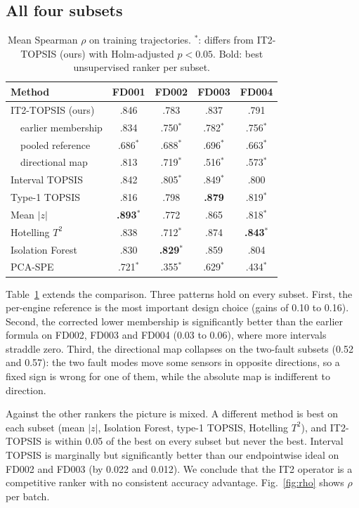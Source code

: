 \documentclass[journal,10pt,twocolumn]{IEEEtran}
\begin{document}
\subsection{All four subsets}
\begin{table}[t]
\centering
\footnotesize
\caption{Mean Spearman $\rho$ on training trajectories. $^{\ast}$: differs from IT2-TOPSIS (ours) with Holm-adjusted $p<0.05$. Bold: best unsupervised ranker per subset.}
\label{tab:all}
\begin{tabular}{lcccc}
\toprule
Method & FD001 & FD002 & FD003 & FD004 \\
\midrule
IT2-TOPSIS (ours) & .846 & .783 & .837 & .791 \\
\ \ earlier membership & .834 & .750$^{\ast}$ & .782$^{\ast}$ & .756$^{\ast}$ \\
\ \ pooled reference & .686$^{\ast}$ & .688$^{\ast}$ & .696$^{\ast}$ & .663$^{\ast}$ \\
\ \ directional map & .813 & .719$^{\ast}$ & .516$^{\ast}$ & .573$^{\ast}$ \\
Interval TOPSIS & .842 & .805$^{\ast}$ & .849$^{\ast}$ & .800 \\
Type-1 TOPSIS & .816 & .798 & \textbf{.879} & .819$^{\ast}$ \\
Mean $|z|$ & \textbf{.893}$^{\ast}$ & .772 & .865 & .818$^{\ast}$ \\
Hotelling $T^2$ & .838 & .712$^{\ast}$ & .874 & \textbf{.843}$^{\ast}$ \\
Isolation Forest & .830 & \textbf{.829}$^{\ast}$ & .859 & .804 \\
PCA-SPE & .721$^{\ast}$ & .355$^{\ast}$ & .629$^{\ast}$ & .434$^{\ast}$ \\
\bottomrule
\end{tabular}
\end{table}
Table~\ref{tab:all} extends the comparison. Three patterns hold on every subset. First, the per-engine reference is the most important design choice (gains of 0.10 to 0.16). Second, the corrected lower membership is significantly better than the earlier formula on FD002, FD003 and FD004 (0.03 to 0.06), where more intervals straddle zero. Third, the directional map collapses on the two-fault subsets (0.52 and 0.57): the two fault modes move some sensors in opposite directions, so a fixed sign is wrong for one of them, while the absolute map is indifferent to direction.

Against the other rankers the picture is mixed. A different method is best on each subset (mean $|z|$, Isolation Forest, type-1 TOPSIS, Hotelling $T^2$), and IT2-TOPSIS is within 0.05 of the best on every subset but never the best. Interval TOPSIS is marginally but significantly better than our endpointwise ideal on FD002 and FD003 (by 0.022 and 0.012). We conclude that the IT2 operator is a competitive ranker with no consistent accuracy advantage. Fig.~\ref{fig:rho} shows $\rho$ per batch.
\end{document}
